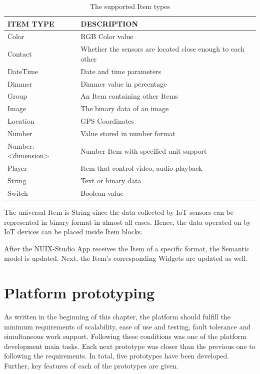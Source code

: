 \begin{table}
  \centering
  \begin{threeparttable}[c]
    \caption{The supported Item types}
    \label{tab:items-table}
    \begin{tabular}{ll}
      \toprule
      ITEM TYPE    &         DESCRIPTION                 \\
      \midrule
      Color &	RGB Color value \\
      Contact & Whether the sensors are located close enough to each other \\
      DateTime & Date and time parameters \\
      Dimmer &	Dimmer value in percentage \\
      Group &	An Item containing other Items \\
      Image &	The binary data of an image \\
      Location & GPS Coordinates \\
      Number & Value stored in number format \\
      Number:<dimension> & Number Item with specified unit support \\
      Player & Item that control video, audio playback \\
      String &	Text or binary data \\
      Switch & Boolean value \\
      \bottomrule
    \end{tabular}
  \end{threeparttable}
\end{table}

The universal Item is String since the data collected by IoT sensors can be represented in binary format in almost all cases. Hence, the data operated on by IoT devices can be placed inside Item blocks.

After the NUIX-Studio App receives the Item of a specific format, the Semantic model is updated. Next, the Item's corresponding Widgets are updated as well.


\section{Platform prototyping}

As written in the beginning of this chapter, the platform should fulfill the minimum requirements of scalability, ease of use and testing, fault tolerance and simultaneous work support. Following these conditions was one of the platform development main tasks. Each next prototype was closer than the previous one to following the requirements. In total, five prototypes have been developed. Further, key features of each of the prototypes are given.

